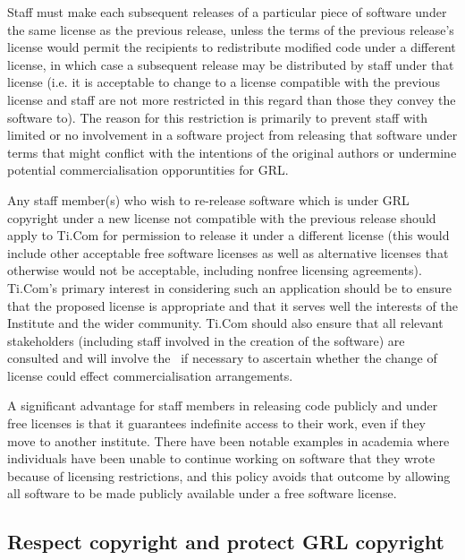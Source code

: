 \documentclass[10pt,a4paper]{article}
\begin{document}
\par Staff must make each subsequent releases of a particular piece of software 
under the same license as the previous release, unless the terms of the previous 
release's license would permit the recipients to redistribute modified code under a 
different license, in which case a subsequent release may be distributed by staff 
under that license (i.e. it is acceptable to change to a license compatible with 
the previous license and staff are not more restricted in this regard than those 
they convey the software to). The reason for this restriction is primarily to prevent 
staff with limited or no involvement in a software project from releasing that 
software under terms that might conflict with the intentions of the original 
authors or undermine potential commercialisation opporuntities for GRL. 

\par Any staff member(s) who wish to re-release software which is under GRL 
copyright under a new license not compatible with the previous release should 
apply to Ti.Com for permission to release it under a different license (this would 
include other acceptable free software licenses as well as alternative licenses 
that otherwise would not be acceptable, including nonfree licensing 
agreements). Ti.Com's primary interest in considering such an application 
should be to ensure that the proposed license is appropriate and that it serves 
well the interests of the Institute and the wider community. Ti.Com should also 
ensure that all relevant stakeholders (including staff involved in the creation of 
the software) are consulted and will involve the \exectitle\ if necessary to 
ascertain whether the change of license could effect commercialisation 
arrangements. 

\par A significant advantage for staff members in releasing code publicly and 
under free licenses is that it guarantees indefinite access to their work, even 
if they move to another institute. There have been notable examples in 
academia where individuals have been unable to continue working on software 
that they wrote because of licensing restrictions, and this policy avoids that 
outcome by allowing all software to be made publicly available under a free 
software license. 


\subsection{Respect copyright and protect GRL copyright}
\label{section:policy.protection}
\end{document}
